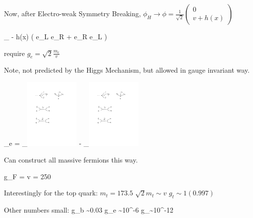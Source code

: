 {Now, after Electro-weak Symmetry Breaking, $\phi_H \rightarrow \phi = \frac{1}{\sqrt{2}} \begin{pmatrix} 0 \\ v + h(x) \end{pmatrix}$

\be
{} \rightarrow {} \supset {}_{} -   h(x) \left( e_L e_R + e_R e_L \right) 
\ee

require $g_e = \sqrt{2} \frac{m_e}{v}$ 

Note, not predicted by the Higgs Mechanism, but allowed in gauge invariant way.

\be
{}_e = _{\includegraphics[width=0.2\textwidth]{./electronMass.pdf}} - _{\includegraphics[width=0.2\textwidth]{./higgsYukawa.pdf}}
\ee

Can construct all massive fermions this way.

\be
g_F =  \hspace*{1in} v = 250 \GeV
\ee

Interestingly for the top quark:  $m_t = 173.5$  $\sqrt{2}m_t \sim v $  $g_t \sim 1 (0.997)$

Other numbers small:
\be
g_b \sim 0.03 \hspace*{1in}  g_e \sim 10^{-6}  \hspace*{1in}  g_\nu \sim 10^{-12} 
\ee


}
